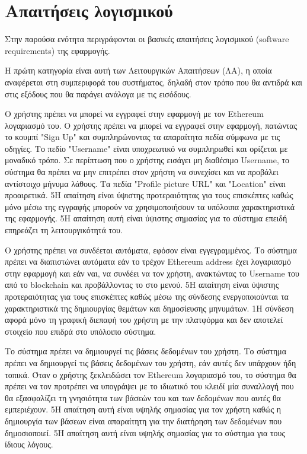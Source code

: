 \section{Απαιτήσεις λογισμικού} \label{section:3-5-software-requirements}

Στην παρούσα ενότητα περιγράφονται οι βασικές απαιτήσεις λογισμικού (software requirements) της εφαρμογής.

Η πρώτη κατηγορία είναι αυτή των Λειτουργικών Απαιτήσεων (ΛΑ), η οποία αναφέρεται στη συμπεριφορά του συστήματος, δηλαδή στον τρόπο που θα αντιδρά και στις εξόδους που θα παράγει ανάλογα με τις εισόδους.

\begin{enumerate}[label=\textbf{<ΛΑ-\arabic*>}, leftmargin=\parindent, align=left, labelwidth=\parindent, labelsep=0pt]
	\sysReqItem
		{\label{srs:functional-srs-sign-up}}
		{Ο χρήστης πρέπει να μπορεί να εγγραφεί στην εφαρμογή με τον Ethereum λογαριασμό του.}
		{Ο χρήστης πρέπει να μπορεί να εγγραφεί στην εφαρμογή, πατώντας το κουμπί "Sign Up" και συμπληρώνοντας τα απαραίτητα πεδία σύμφωνα με τις οδηγίες. Το πεδίο "Username" είναι υποχρεωτικό να συμπληρωθεί και ορίζεται με μοναδικό τρόπο. Σε περίπτωση που ο χρήστης εισάγει μη διαθέσιμο Username, το σύστημα θα πρέπει να μην επιτρέπει στον χρήστη να συνεχίσει και να προβάλει αντίστοιχο μήνυμα λάθους. Τα πεδία "Profile picture URL" και "Location" είναι προαιρετικά.}
		{5}{Η απαίτηση είναι ύψιστης προτεραιότητας για τους επισκέπτες καθώς μόνο μέσω της εγγραφής μπορούν να χρησιμοποιήσουν τα υπόλοιπα χαρακτηριστικά της εφαρμογής.}
		{5}{Η απαίτηση αυτή είναι ύψιστης σημασίας για το σύστημα επειδή επηρεάζει τη λειτουργικότητά του.}

	\sysReqItem
		{\label{srs:functional-srs-sign-in}}
		{Ο χρήστης πρέπει να συνδέεται αυτόματα, εφόσον είναι εγγεγραμμένος.}
		{Το σύστημα πρέπει να διαπιστώνει αυτόματα εάν το τρέχον Ethereum address έχει λογαριασμό στην εφαρμογή και εάν ναι, να συνδέει να τον χρήστη, ανακτώντας το Username του από το blockchain και προβάλλοντας το στο μενού.}
		{5}{Η απαίτηση είναι ύψιστης προτεραιότητας για τους επισκέπτες καθώς μέσω της σύνδεσης ενεργοποιούνται τα χαρακτηριστικά της δημιουργίας θεμάτων και δημοσίευσης μηνυμάτων.}
		{1}{Η σύνδεση αφορά μόνο τη γραφική διεπαφή του χρήστη με την πλατφόρμα και δεν αποτελεί στοιχείο που επιδρά στο υπόλοιπο σύστημα.}

	\sysReqItem
		{\label{srs:functional-srs-create-user-databases}}
		{Το σύστημα πρέπει να δημιουργεί τις βάσεις δεδομένων του χρήστη.}
		{Το σύστημα πρέπει να δημιουργεί τις βάσεις δεδομένων του χρήστη, εάν αυτές δεν υπάρχουν ήδη τοπικά. Όταν ο χρήστης ξεκλειδώσει τον Ethereum λογαριασμό του, το σύστημα θα πρέπει να τον προτρέπει να υπογράψει με το ιδιωτικό του κλειδί μία συναλλαγή που θα εξασφαλίζει τη γνησιότητα των βάσεών του και των δεδομένων που αυτές θα εμπεριέχουν.}
		{5}{Η απαίτηση αυτή είναι υψηλής σημασίας για τον χρήστη καθώς η δημιουργία των βάσεων είναι απαραίτητη για την διατήρηση των δεδομένων που δημοσιοποιεί.}
		{5}{Η απαίτηση αυτή είναι υψηλής σημασίας για το σύστημα για τους ίδιους λόγους.}


\end{enumerate}
